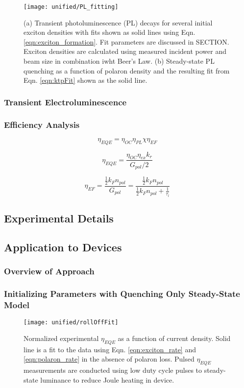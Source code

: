 \documentclass[../thesis.tex]{subfiles}
\begin{document}
\begin{figure}[h]
\texttt{[image: unified/PL\_fitting]}
\caption{(a) Transient photoluminescence (PL) decays for several initial exciton densities with fits shown as solid lines using Eqn. \ref{eqn:exciton_formation}.  Fit parameters are discussed in SECTION.  Exciton densities are calculated using measured incident power and beam size in combination iwht Beer's Law.  (b) Steady-state PL quenching as a function of polaron density and the resulting fit from Eqn. \ref{eqn:ktpFit} shown as the solid line.}
\label{fig:PL_fitting}
\end{figure}
\subsubsection{Transient Electroluminescence}
\subsubsection{Efficiency Analysis}

\begin{equation}
\eta_{EQE}=\eta_{OC}\eta_{PL}\chi\eta_{EF}
\label{eqn:eqeSimple}
\end{equation}

\begin{equation}
\eta_{EQE}=\frac{\eta_{OC}\eta_{ex}k_r}{G_{pol}/2}
\label{eqn:eqeReform}
\end{equation}

\begin{equation}
\eta_{EF}=\frac{\frac{1}{2}k_Fn_{pol}}{G_{pol}}=\frac{\frac{1}{2}k_Fn_{pol}}{\frac{1}{2}k_Fn_{pol}+\frac{1}{\tau_l}}
\label{eqn:excitonFormation}
\end{equation}

\subsection{Experimental Details}
\subsection{Application to Devices}
\subsubsection{Overview of Approach}
\subsubsection{Initializing Parameters with Quenching Only Steady-State Model}
\begin{figure}[h]
\texttt{[image: unified/rollOffFit]}
\caption{Normalized experimental $\eta_{EQE}$ as a function of current density.  Solid line is a fit to the data using Eqn. \ref{eqn:exciton_rate} and \ref{eqn:polaron_rate} in the absence of polaron loss.  Pulsed $\eta_{EQE}$ measurements are conducted using low duty cycle pulses to steady-state luminance to reduce Joule heating in device.}
\label{fig:rollOffFit}
\end{figure}
\end{document}
